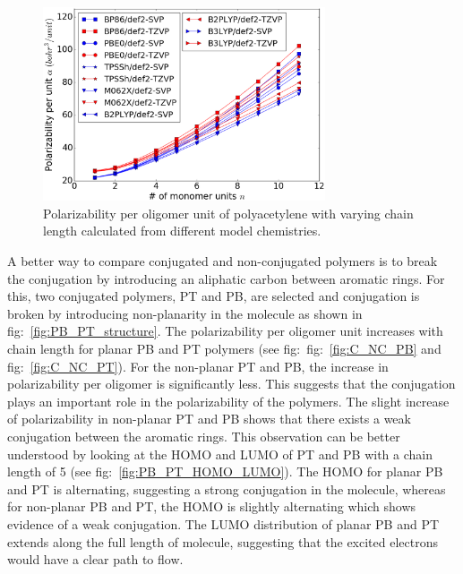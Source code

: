 \begin{figure}[htbp] 
	\centering
	\includegraphics[width=0.744\textwidth]{Chapter-3/Figures/PA_per.eps}
	\caption{Polarizability per oligomer unit of polyacetylene with varying chain length calculated from different model chemistries.} 
	\label{fig:PA_per} 
\end{figure}  


A better way to compare conjugated and non-conjugated polymers is to break the conjugation by introducing an aliphatic carbon between aromatic rings. For this, two conjugated polymers, PT and PB, are selected and conjugation is broken by introducing non-planarity in the molecule as shown in fig:\ \ref{fig:PB_PT_structure}. The polarizability per oligomer unit increases with chain length for planar PB and PT polymers (see fig:\ fig:\ \ref{fig:C_NC_PB} and fig:\ \ref{fig:C_NC_PT}). For the non-planar PT and PB, the increase in polarizability per oligomer is significantly less. This suggests that the conjugation plays an important role in the polarizability of the polymers. The slight increase of polarizability in non-planar PT and PB shows that there exists a weak conjugation between the aromatic rings. This observation can be better understood by looking at the HOMO and LUMO of PT and PB with a chain length of 5 (see fig:\ \ref{fig:PB_PT_HOMO_LUMO}). The HOMO for planar PB and PT is alternating, suggesting a strong conjugation in the molecule, whereas for non-planar PB and PT, the HOMO is slightly alternating which shows evidence of a weak conjugation. The LUMO distribution of planar PB and PT extends along the full length of molecule, suggesting that the excited electrons would have a clear path to flow. 

